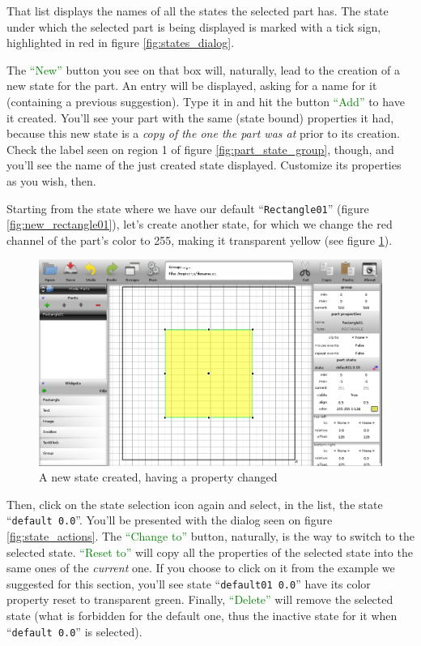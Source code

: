 \documentclass[a4paper]{profusion}
\newcommand{\GUIButton}[1]{\textcolor{green}{#1}} %
\begin{document}
That list displays the names of all the states the selected part has.
The state under which the selected part is being displayed is marked
with a tick sign, highlighted in red in figure
\ref{fig:states_dialog}.

The \GUIButton{``New''} button you see on that box will, naturally,
lead to the creation of a new state for the part. An entry will be
displayed, asking for a name for it (containing a previous
suggestion). Type it in and hit the button \GUIButton{``Add''} to have
it created. You'll see your part with the same (state bound)
properties it had, because this new state is a \emph{copy of the one
  the part was at} prior to its creation. Check the label seen on
region 1 of figure \ref{fig:part_state_group}, though, and you'll see
the name of the just created state displayed. Customize its properties
as you wish, then.

Starting from the state where we have our default
``\texttt{Rectangle01}'' (figure \ref{fig:new_rectangle01}), let's
create another state, for which we change the red channel of the
part's color to 255, making it transparent yellow (see figure
\ref{fig:new_state}).

\begin{figure}[h!]
  \centering
  \includegraphics[width=1.0\textwidth]{images/new_state.png}
  \caption{A new state created, having a property changed}
  \label{fig:new_state}
\end{figure}

Then, click on the state selection icon again and select, in the list,
the state ``\texttt{default 0.0}''. You'll be presented with the
dialog seen on figure \ref{fig:state_actions}. The \GUIButton{``Change
  to''} button, naturally, is the way to switch to the selected state.
\GUIButton{``Reset to''} will copy all the properties of the selected
state into the same ones of the \emph{current} one. If you choose to
click on it from the example we suggested for this section, you'll see
state ``\texttt{default01 0.0}'' have its color property reset to
transparent green. Finally, \GUIButton{``Delete''} will remove the
selected state (what is forbidden for the default one, thus the
inactive state for it when ``\texttt{default 0.0}'' is selected).
\end{document}

